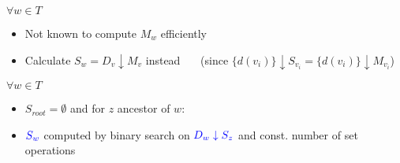 \documentclass[18pt]{beamer}
\begin{document}
\begin{frame}
\begin{overprint}
\begin{itemize}
           	    \end{itemize}
                $\forall w \in T$
                \begin{itemize}
                	\item Not known to compute $M_w$ efficiently
                	\item Calculate $S_w = D_v \downarrow M_v$ instead \ \ \ ({\footnotesize since $\{d(v_i)\} \downarrow S_{v_i} = \{d(v{_i})\} \downarrow M_{v_i}$})
                \end{itemize}
            	$\forall w \in T$
            	\begin{itemize}
            		\item $S_{root} = \emptyset$ and for $z$ ancestor of $w$:
            		\item $\color{blue} S_w$ computed by binary search on $\color{blue} D_w \downarrow S_z$ and const. number of set operations
            	\end{itemize}
            \end{overprint}
		
\end{frame}
\end{document}
